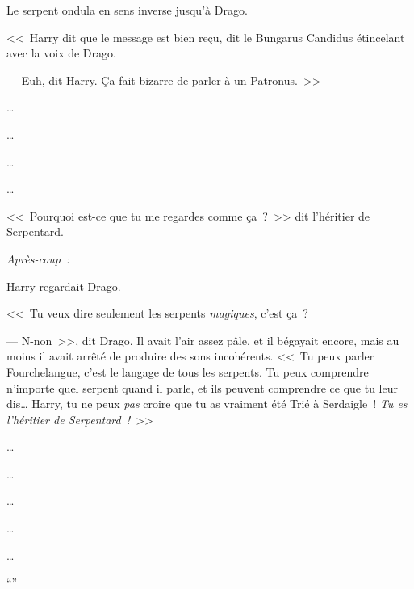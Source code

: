Le serpent ondula en sens inverse jusqu'à Drago.

<<~Harry dit que le message est bien reçu, dit le Bungarus Candidus étincelant avec la voix de Drago.

--- Euh, dit Harry. Ça fait bizarre de parler à un Patronus.~>>

…

…

…

…

<<~Pourquoi est-ce que tu me regardes comme ça~?~>> dit l'héritier de Serpentard.

\later

\emph{Après-coup~:}

Harry regardait Drago.

<<~Tu veux dire seulement les serpents \emph{magiques}, c'est ça~?

--- N-non~>>, dit Drago. Il avait l'air assez pâle, et il bégayait encore, mais au moins il avait arrêté de produire des sons incohérents. <<~Tu peux parler Fourchelangue, c'est le langage de tous les serpents. Tu peux comprendre n'importe quel serpent quand il parle, et ils peuvent comprendre ce que tu leur dis… Harry, tu ne peux \emph{pas} croire que tu as vraiment été Trié à Serdaigle~! \emph{Tu es l'héritier de Serpentard~!}~>>

…

…

…

…

…

“” 


